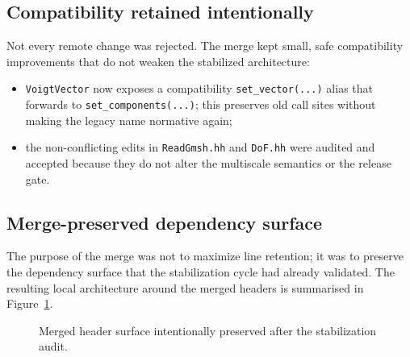 \subsection{Compatibility retained intentionally}

Not every remote change was rejected.  The merge kept small, safe compatibility
improvements that do not weaken the stabilized architecture:
\begin{itemize}
  \item \texttt{VoigtVector} now exposes a compatibility
    \texttt{set\_vector(...)} alias that forwards to
    \texttt{set\_components(...)}; this preserves old call sites without making
    the legacy name normative again;
  \item the non-conflicting edits in \texttt{ReadGmsh.hh} and \texttt{DoF.hh}
    were audited and accepted because they do not alter the multiscale
    semantics or the release gate.
\end{itemize}

\subsection{Merge-preserved dependency surface}

The purpose of the merge was not to maximize line retention; it was to preserve
the dependency surface that the stabilization cycle had already validated.  The
resulting local architecture around the merged headers is summarised in
Figure~\ref{fig:ms-stab-merge-class-diagram}.

\begin{figure}[htb]
\centering
{}
\caption{Merged header surface intentionally preserved after the stabilization audit.}
\label{fig:ms-stab-merge-class-diagram}
\end{figure}

